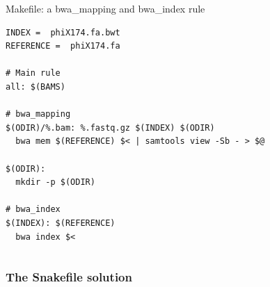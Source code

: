 \documentclass{beamer}
\begin{document}
\begin{frame}[fragile]
\begin{columns}
\begin{column}[T]{9cm}
\begin{block}{Makefile: a bwa\_mapping and bwa\_index rule}
\begin{lstlisting}
INDEX =  phiX174.fa.bwt
REFERENCE =  phiX174.fa

# Main rule
all: $(BAMS)

# bwa_mapping
$(ODIR)/%.bam: %.fastq.gz $(INDEX) $(ODIR)
  bwa mem $(REFERENCE) $< | samtools view -Sb - > $@

$(ODIR):
  mkdir -p $(ODIR)

# bwa_index
$(INDEX): $(REFERENCE)
  bwa index $<
    \end{lstlisting}
    \end{block}
  \end{column}
  \end{columns}
\end{frame}


\begin{frame}[fragile]
    \frametitle{The Snakefile solution}
    

\end{frame}
\end{document}
